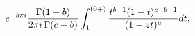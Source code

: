 \[e^{-b\pi i}\frac{\mathop{\Gamma\/}\nolimits\!\left(1-b\right)}{2\pi i\mathop{%
\Gamma\/}\nolimits\!\left(c-b\right)}\int_{1}^{(0+)}\frac{t^{b-1}(1-t)^{c-b-1}%
}{(1-zt)^{a}}dt,\]